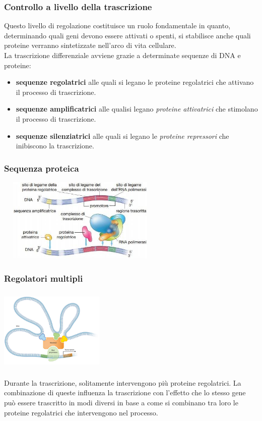 \documentclass[hyperref={pdfpagelabels=false}]{beamer}
\begin{document}
\begin{frame} \frametitle{Controllo a livello della trascrizione}
Questo livello di regolazione costituisce un ruolo fondamentale in quanto, determinando quali geni devono essere attivati o spenti, si stabilisce anche quali proteine verranno sintetizzate nell'arco di vita cellulare.\\
La trascrizione differenziale avviene grazie a determinate sequenze di DNA e proteine:
\begin{itemize}
\item \textbf{sequenze regolatrici} alle quali si legano le proteine regolatrici che attivano il processo di trascrizione.
\item \textbf{sequenze amplificatrici} alle qualisi legano \emph{proteine attivatrici} che stimolano il processo di trascrizione.
\item \textbf{sequenze silenziatrici} alle quali si legano le \emph{proteine repressori} che inibiscono la trascrizione.
\end{itemize}
\end{frame}


\begin{frame}\frametitle{Sequenza proteica}
\centering \includegraphics[width=8cm,height=4cm]{sequenzeProteine.jpg}
\end{frame}


\begin{frame}\frametitle{Regolatori multipli}
\begin{minipage}[c]{.45\textwidth}
\includegraphics[width=5cm,height=4cm]{regolatori.jpg}
\end{minipage}
\begin{minipage}[c]{.5\textwidth}
Durante la trascrizione, solitamente intervengono pi\`u proteine regolatrici. La combinazione di queste influenza la trascrizione con l'effetto che lo stesso gene pu\`o essere trascritto in modi diversi in base a come si combinano tra loro le proteine regolatrici che intervengono nel processo.
\end{minipage}
\end{frame}
\end{document}
